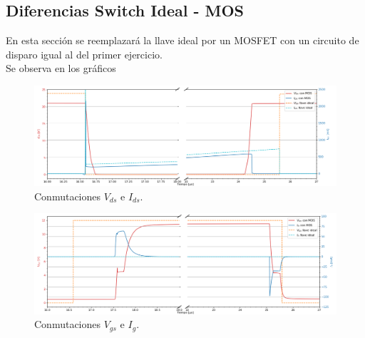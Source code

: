 



\subsection{Diferencias Switch Ideal - MOS}
En esta sección se reemplazará la llave ideal por un MOSFET con un circuito de disparo igual al del primer ejercicio.\\
Se observa en los gráficos 
\begin{multicols}{2}
\begin{figure}[H]
	\centering
	\includegraphics[width=0.9\linewidth]{ImagenesEjercicio-3/ids-vds-2v3}
	\caption{Conmutaciones $V_{ds}$ e  $I_{ds}$.}
	\label{fig:ej3:conmutacionON_OFF_VDS_IDS}
\end{figure}
\begin{figure}[H]
	\centering
	\includegraphics[width=0.9\linewidth]{ImagenesEjercicio-3/ig-vgs-2v3}
	\caption{Conmutaciones $V_{gs}$ e  $I_{g}$.}
	\label{fig:ej3:conmutacionON_OFF_VGS_IG}
\end{figure}
\end{multicols}
